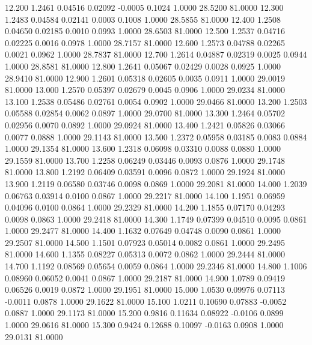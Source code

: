   12.200   1.2461   0.04516   0.02092  -0.0005   0.1024   1.0000  28.5200  81.0000
  12.300   1.2483   0.04584   0.02141   0.0003   0.1008   1.0000  28.5855  81.0000
  12.400   1.2508   0.04650   0.02185   0.0010   0.0993   1.0000  28.6503  81.0000
  12.500   1.2537   0.04716   0.02225   0.0016   0.0978   1.0000  28.7157  81.0000
  12.600   1.2573   0.04788   0.02265   0.0021   0.0962   1.0000  28.7837  81.0000
  12.700   1.2614   0.04887   0.02319   0.0025   0.0944   1.0000  28.8581  81.0000
  12.800   1.2641   0.05067   0.02429   0.0028   0.0925   1.0000  28.9410  81.0000
  12.900   1.2601   0.05318   0.02605   0.0035   0.0911   1.0000  29.0019  81.0000
  13.000   1.2570   0.05397   0.02679   0.0045   0.0906   1.0000  29.0234  81.0000
  13.100   1.2538   0.05486   0.02761   0.0054   0.0902   1.0000  29.0466  81.0000
  13.200   1.2503   0.05588   0.02854   0.0062   0.0897   1.0000  29.0700  81.0000
  13.300   1.2464   0.05702   0.02956   0.0070   0.0892   1.0000  29.0924  81.0000
  13.400   1.2421   0.05826   0.03066   0.0077   0.0888   1.0000  29.1143  81.0000
  13.500   1.2372   0.05958   0.03185   0.0083   0.0884   1.0000  29.1354  81.0000
  13.600   1.2318   0.06098   0.03310   0.0088   0.0880   1.0000  29.1559  81.0000
  13.700   1.2258   0.06249   0.03446   0.0093   0.0876   1.0000  29.1748  81.0000
  13.800   1.2192   0.06409   0.03591   0.0096   0.0872   1.0000  29.1924  81.0000
  13.900   1.2119   0.06580   0.03746   0.0098   0.0869   1.0000  29.2081  81.0000
  14.000   1.2039   0.06763   0.03914   0.0100   0.0867   1.0000  29.2217  81.0000
  14.100   1.1951   0.06959   0.04096   0.0100   0.0864   1.0000  29.2329  81.0000
  14.200   1.1855   0.07170   0.04293   0.0098   0.0863   1.0000  29.2418  81.0000
  14.300   1.1749   0.07399   0.04510   0.0095   0.0861   1.0000  29.2477  81.0000
  14.400   1.1632   0.07649   0.04748   0.0090   0.0861   1.0000  29.2507  81.0000
  14.500   1.1501   0.07923   0.05014   0.0082   0.0861   1.0000  29.2495  81.0000
  14.600   1.1355   0.08227   0.05313   0.0072   0.0862   1.0000  29.2444  81.0000
  14.700   1.1192   0.08569   0.05654   0.0059   0.0864   1.0000  29.2346  81.0000
  14.800   1.1006   0.08960   0.06052   0.0041   0.0867   1.0000  29.2187  81.0000
  14.900   1.0789   0.09419   0.06526   0.0019   0.0872   1.0000  29.1951  81.0000
  15.000   1.0530   0.09976   0.07113  -0.0011   0.0878   1.0000  29.1622  81.0000
  15.100   1.0211   0.10690   0.07883  -0.0052   0.0887   1.0000  29.1173  81.0000
  15.200   0.9816   0.11634   0.08922  -0.0106   0.0899   1.0000  29.0616  81.0000
  15.300   0.9424   0.12688   0.10097  -0.0163   0.0908   1.0000  29.0131  81.0000
